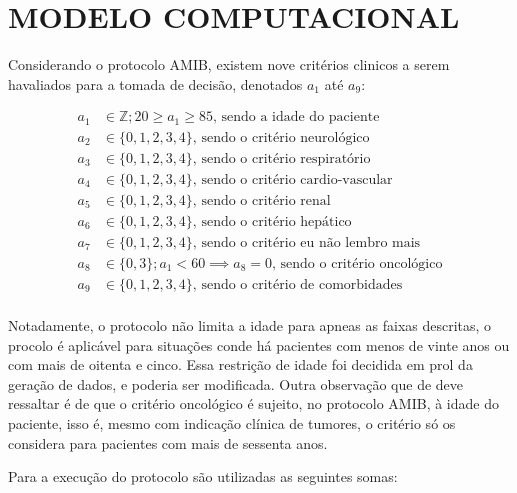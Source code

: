 \documentclass[12pt]{article}
\begin{document}
\section{MODELO COMPUTACIONAL}

Considerando o protocolo AMIB, existem nove critérios clinicos a serem havaliados para a tomada de decisão, denotados $a_1$ até $a_9$:

\[
    \begin{split}
        a_1 &\in \mathbb{Z}; 20 \ge a_1 \ge 85\text{, sendo a idade do paciente} \\
        a_2 &\in \{0, 1, 2, 3, 4\}\text{, sendo o critério neurológico} \\
        a_3 &\in \{0, 1, 2, 3, 4\}\text{, sendo o critério respiratório} \\
        a_4 &\in \{0, 1, 2, 3, 4\}\text{, sendo o critério cardio-vascular} \\
        a_5 &\in \{0, 1, 2, 3, 4\}\text{, sendo o critério renal} \\
        a_6 &\in \{0, 1, 2, 3, 4\}\text{, sendo o critério hepático} \\
        a_7 &\in \{0, 1, 2, 3, 4\}\text{, sendo o critério eu não lembro mais} \\
        a_8 &\in \{0, 3\}; a_1 < 60 \implies a_8=0\text{, sendo o critério oncológico} \\
        a_9 &\in \{0, 1, 2, 3, 4\}\text{, sendo o critério de comorbidades} \\
    \end{split}
\] 

Notadamente, o protocolo não limita a idade para apneas as faixas descritas, o procolo é aplicável para situações conde há pacientes com menos de vinte anos ou com mais de oitenta e cinco.
Essa restrição de idade foi decidida em prol da geração de dados, e poderia ser modificada.
Outra observação que de deve ressaltar é de que o critério oncológico é sujeito, no protocolo AMIB, à idade do paciente, isso é, mesmo com indicação clínica de tumores, o critério só os considera para pacientes com mais de sessenta anos.

Para a execução do protocolo são utilizadas as seguintes somas:
\end{document}
